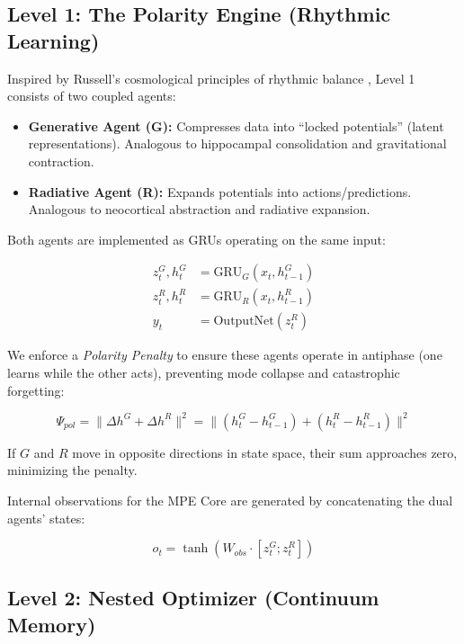 \documentclass[11pt]{article}
\begin{document}
\subsection{Level 1: The Polarity Engine (Rhythmic Learning)}

Inspired by Russell's cosmological principles of rhythmic balance \cite{russell1926}, Level 1 consists of two coupled agents:

\begin{itemize}
    \item \textbf{Generative Agent (G):} Compresses data into ``locked potentials'' (latent representations). Analogous to hippocampal consolidation and gravitational contraction.

    \item \textbf{Radiative Agent (R):} Expands potentials into actions/predictions. Analogous to neocortical abstraction and radiative expansion.
\end{itemize}

Both agents are implemented as GRUs operating on the same input:

\begin{align}
z_t^G, h_t^G &= \text{GRU}_G(x_t, h_{t-1}^G) \\
z_t^R, h_t^R &= \text{GRU}_R(x_t, h_{t-1}^R) \\
y_t &= \text{OutputNet}(z_t^R)
\end{align}

We enforce a \textit{Polarity Penalty} to ensure these agents operate in antiphase (one learns while the other acts), preventing mode collapse and catastrophic forgetting:

\begin{equation}
\Psi_{pol} = \| \Delta h^G + \Delta h^R \|^2 = \| (h_t^G - h_{t-1}^G) + (h_t^R - h_{t-1}^R) \|^2
\end{equation}

If $G$ and $R$ move in opposite directions in state space, their sum approaches zero, minimizing the penalty.

Internal observations for the MPE Core are generated by concatenating the dual agents' states:

\begin{equation}
o_t = \tanh(W_{obs} \cdot [z_t^G ; z_t^R])
\end{equation}

\subsection{Level 2: Nested Optimizer (Continuum Memory)}
\end{document}
